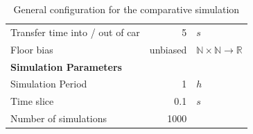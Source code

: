 \begin{table}[]
\begin{tabular}{lrl}
Transfer time into / out of car & 5 & $s$\\
Floor bias & unbiased & $ \mathbb{N} \times \mathbb{N} \rightarrow \mathbb{R} $ \\
\hline
\multicolumn{3}{l}{\textbf{Simulation Parameters}}\\
Simulation Period & 1 & $h$\\
Time slice & 0.1 & $s$\\
Number of simulations & 1000 & \\
\end{tabular}
\caption{\label{tab:design:simulationconfig} General configuration for the comparative simulation}
\end{table}

\begingroup
\renewcommand*{\arraystretch}{1.0}
\begin{table}[htb]
\centering
{}
\caption{\label{tab:design:trafficitemprototypes} Prototypes for traffic items in the simulation, chosen at equal likelihood}
\end{table}
\endgroup

